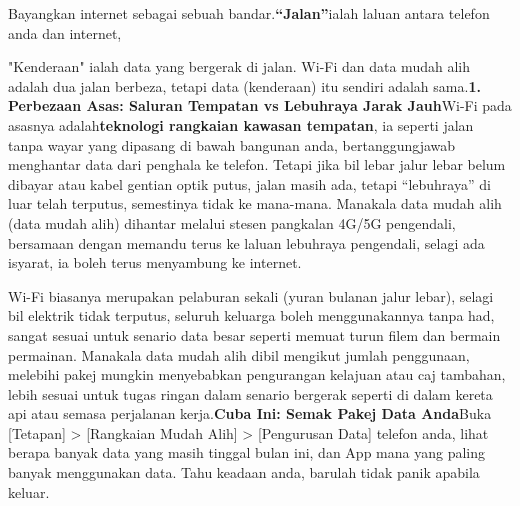 


Bayangkan internet sebagai sebuah bandar.\textbf{“Jalan”}ialah laluan antara telefon anda dan internet,

\begin{tcbinfo}{"Kenderaan"}
ialah data yang bergerak di jalan. Wi-Fi dan data mudah alih adalah dua jalan berbeza, tetapi data (kenderaan) itu sendiri adalah sama.\textbf{1. Perbezaan Asas: Saluran Tempatan vs Lebuhraya Jarak Jauh}Wi-Fi pada asasnya adalah\textbf{teknologi rangkaian kawasan tempatan}, ia seperti jalan tanpa wayar yang dipasang di bawah bangunan anda, bertanggungjawab menghantar data dari penghala ke telefon. Tetapi jika bil lebar jalur lebar belum dibayar atau kabel gentian optik putus, jalan masih ada, tetapi “lebuhraya” di luar telah terputus, semestinya tidak ke mana-mana. Manakala data mudah alih (data mudah alih) dihantar melalui stesen pangkalan 4G/5G pengendali, bersamaan dengan memandu terus ke laluan lebuhraya pengendali, selagi ada isyarat, ia boleh terus menyambung ke internet.

\end{tcbinfo}


Wi-Fi biasanya merupakan pelaburan sekali (yuran bulanan jalur lebar), selagi bil elektrik tidak terputus, seluruh keluarga boleh menggunakannya tanpa had, sangat sesuai untuk senario data besar seperti memuat turun filem dan bermain permainan. Manakala data mudah alih dibil mengikut jumlah penggunaan, melebihi pakej mungkin menyebabkan pengurangan kelajuan atau caj tambahan, lebih sesuai untuk tugas ringan dalam senario bergerak seperti di dalam kereta api atau semasa perjalanan kerja.\textbf{Cuba Ini: Semak Pakej Data Anda}Buka [Tetapan] > [Rangkaian Mudah Alih] > [Pengurusan Data] telefon anda, lihat berapa banyak data yang masih tinggal bulan ini, dan App mana yang paling banyak menggunakan data. Tahu keadaan anda, barulah tidak panik apabila keluar.

